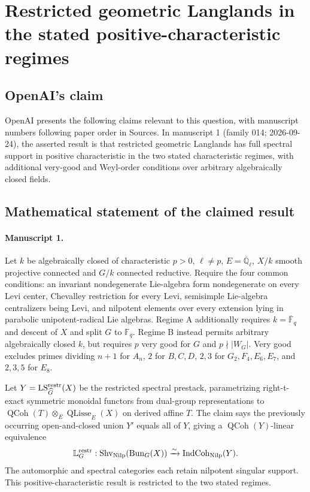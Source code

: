 \documentclass[11pt]{article}
\begin{document}
\section*{Restricted geometric Langlands in the stated positive-characteristic regimes}

\subsection{OpenAI's claim}
OpenAI presents the following claims relevant to this question, with manuscript numbers following paper order in Sources. In manuscript 1 (family 014; 2026-09-24), the asserted result is that restricted geometric Langlands has full spectral support in positive characteristic in the two stated characteristic regimes, with additional very-good and Weyl-order conditions over arbitrary algebraically closed fields.

\subsection{Mathematical statement of the claimed result}
\paragraph{Manuscript 1.}
Let $k$ be algebraically closed of characteristic $p>0$, $\ell\ne p$, $E=\overline{\mathbb Q}_{\ell}$, $X/k$ smooth projective connected and $G/k$ connected reductive. Require the four common conditions: an invariant nondegenerate Lie-algebra form nondegenerate on every Levi center, Chevalley restriction for every Levi, semisimple Lie-algebra centralizers being Levi, and nilpotent elements over every extension lying in parabolic unipotent-radical Lie algebras. Regime A additionally requires $k=\overline{\mathbb F}_q$ and descent of $X$ and split $G$ to $\mathbb F_q$. Regime B instead permits arbitrary algebraically closed $k$, but requires $p$ very good for $G$ and $p\nmid|W_G|$. Very good excludes primes dividing $n+1$ for $A_n$, $2$ for $B,C,D$, $2,3$ for $G_2,F_4,E_6,E_7$, and $2,3,5$ for $E_8$.

Let $Y=\operatorname{LS}_{\widehat G}^{\rm restr}(X)$ be the restricted spectral prestack, parametrizing right-t-exact symmetric monoidal functors from dual-group representations to $\operatorname{QCoh}(T)\otimes_E\operatorname{QLisse}_E(X)$ on derived affine $T$. The claim says the previously occurring open-and-closed union $Y'$ equals all of $Y$, giving a $\operatorname{QCoh}(Y)$-linear equivalence
\[
 \mathbb L_G^{\rm restr}:\operatorname{Shv}_{\rm Nilp}(\operatorname{Bun}_G(X))
 \xrightarrow{\sim}\operatorname{IndCoh}_{\rm Nilp}(Y).
\]
The automorphic and spectral categories each retain nilpotent singular support. This positive-characteristic result is restricted to the two stated regimes.
\end{document}
